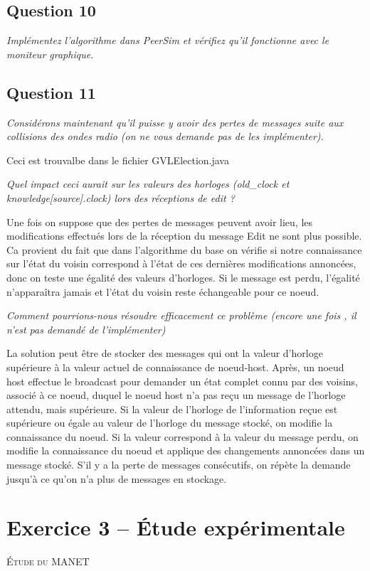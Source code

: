 \documentclass[11pt,a4paper,sans]{report}
\begin{document}
	\section{Question 10}
	\textit{Implémentez l’algorithme dans PeerSim et vérifiez qu’il fonctionne avec le moniteur graphique.}
	\section{Question 11}
	\textit{Considérons maintenant qu’il puisse y avoir des pertes de messages suite aux collisions des ondes radio (on ne vous demande pas de les implémenter).}
	\par Ceci est trouvalbe dans le fichier GVLElection.java

	\textit{Quel impact ceci aurait sur les valeurs des horloges (old\_clock et knowledge[source].clock) lors des réceptions de edit ?}
	\par Une fois on suppose que des pertes de messages peuvent avoir lieu, les modifications effectués lors de la réception du message Edit ne sont plus possible. Ca provient du fait que dans l’algorithme du base on vérifie si notre connaissance sur l'état du voisin correspond à l'état de ces dernières modifications annoncées, donc on teste une égalité des valeurs d’horloges. Si le message est perdu, l'égalité n'apparaîtra jamais et l'état du voisin reste échangeable pour ce noeud.


	\textit{Comment pourrions-nous résoudre efficacement ce problème (encore une fois , il n’est pas demandé de l’implémenter)}
	\par La solution peut être de stocker des messages qui ont la valeur d’horloge supérieure à la valeur actuel de connaissance de noeud-host. Après, un noeud host effectue le broadcast pour demander un état complet connu par des voisins, associé à ce noeud, duquel le noeud host n’a pas reçu un message de l’horloge attendu, mais supérieure. Si la valeur de l’horloge de l’information reçue est supérieure ou égale au valeur de l’horloge du message stocké, on modifie la connaissance du noeud. Si la valeur correspond à la valeur du message perdu, on modifie la connaissance du noeud et applique des changements annoncées dans un message stocké. S’il y a la perte de messages consécutifs, on répète la demande jusqu'à ce qu’on n’a plus de messages en stockage.

	\newpage
	\chapter{Exercice 3 – Étude expérimentale}
	\begin{center}
		\textsc{\large Étude du MANET}
	\end{center}
\end{document}
